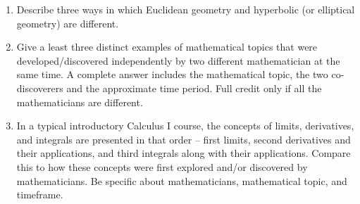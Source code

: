\documentclass[12pt]{article}
\begin{document}
\begin{enumerate}
\item Describe three ways in which Euclidean geometry and hyperbolic (or elliptical geometry) are different.

\item Give a least three distinct examples of mathematical topics that were developed/discovered independently by two different mathematician at the same time. A complete answer includes the mathematical topic, the two co-discoverers and the approximate time period. Full credit only if all the mathematicians are different.

\item In a typical introductory Calculus I course, the concepts of limits, derivatives, and integrals are presented in that order -- first limits, second derivatives and their applications, and third integrals along with their applications. Compare this to how these concepts were first explored and/or discovered by mathematicians. Be specific about mathematicians, mathematical topic, and timeframe.
\end{enumerate}
\end{document}
